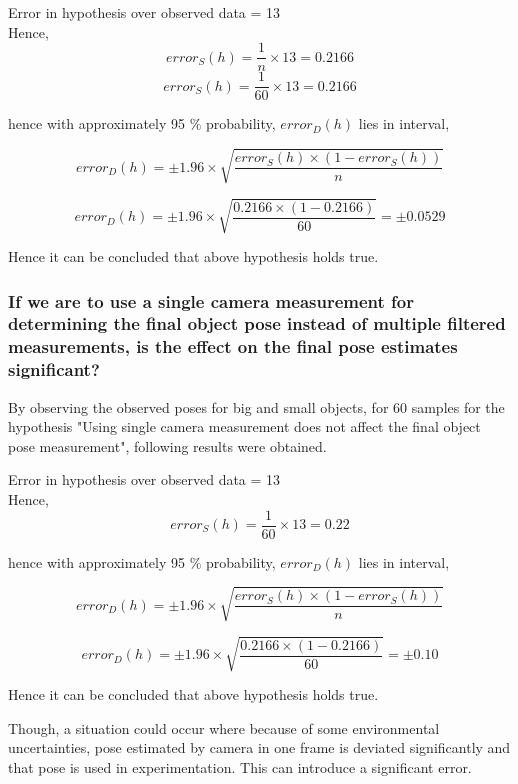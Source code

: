 \vspace{0.5cm}


Error in hypothesis over observed data = 13
\\
Hence,
\\
$$error_{S}(h) = \frac{1}{n} \times 13 = 0.2166$$
$$error_{S}(h) = \frac{1}{60} \times 13 = 0.2166$$

hence with approximately 95 $\%$ probability,
$error_{D}(h)$ lies in interval,

$$error_{D}(h) = \pm 1.96 \times \sqrt{\frac{error_{S}(h) \times (1 - error_{S}(h))}{n}} $$

$$error_{D}(h) = \pm 1.96 \times \sqrt{\frac{0.2166 \times (1 - 0.2166)}{60}} = \pm 0.0529$$

Hence it can be concluded that above hypothesis holds true. 



\subsubsection{If we are to use a single camera measurement for determining the final object pose instead of multiple filtered measurements, is the effect on the final pose estimates significant?}

By observing the observed poses for big and small objects, for 60 samples for the hypothesis "Using single camera measurement does not affect the final object pose measurement", following results were obtained.

\vspace{0.5cm}

Error in hypothesis over observed data = 13
\\
Hence,
\\
$$error_{S}(h) = \frac{1}{60} \times 13 = 0.22$$

hence with approximately 95 $\%$ probability,
$error_{D}(h)$ lies in interval,

$$error_{D}(h) = \pm 1.96 \times \sqrt{\frac{error_{S}(h) \times (1 - error_{S}(h))}{n}} $$

$$error_{D}(h) = \pm 1.96 \times \sqrt{\frac{0.2166 \times (1 - 0.2166)}{60}} = \pm 0.10$$

Hence it can be concluded that above hypothesis holds true. 

Though, a situation could occur where because of some environmental uncertainties, pose estimated by camera in one frame is deviated significantly and that pose is used in experimentation. This can introduce a significant error. 

